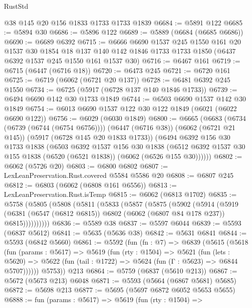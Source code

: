\begin{lexlean}{RustStd}
\begin{coremodule}
    @38
    @145
    @20
    @156
    @1833
    @1733
    @1733
    @1839
@6684 := @5891 @122
@6685 := @5894 @30
@6686 := @5896 @122
@6689 := @5889 (@6684 (@6685 @6686))
@6690 := @6689 @6392
@6715 := @6666
    @6690
    @1537
    @245
    @1550
    @161
    @20
    @1537
    @30
    @1854
    @18
    @137
    @140
    @142
    @1846
    @1733
    @1733
    @1850
    (@6437 @6392 @1537 @245 @1550 @161 @1537 @30)
@6716 := @6467 @161
@6719 := @6715 (@6447 (@6716 @18))
@6720 := @6473 @245
@6721 := @6720 @161
@6725 := @6719 (@6062 (@6721 @20 @137))
@6728 := @6481 @6392 @245 @1550
@6734 := @6725 (@5917 (@6728 @137 @140 @1846 @1733))
@6739 := @6494 @6690 @142 @30 @1733 @1849
@6744 := @6503 @6690 @1537 @142 @30 @1849
@6754 := @6013 @6690 @1537 @122 @30 @122 @1849 (@6021 (@6022 @6690 @122))
@6756 := @6029 (@6030 @1849)
@6800 := @6665
    (@6683
      (@6734 (@6739 (@6744 (@6754 @6756))))
      (@6447 (@6716 @38))
      (@6062 (@6721 @21 @145))
      (@5917 (@6728 @145 @20 @1833 @1733))
      (@6494
        @6392
        @156
        @30
        @1733
        @1838
        (@6503
          @6392
          @1537
          @156
          @30
          @1838
          (@6512 @6392 @1537 @30 @155 @1838 (@6520 (@6521 @1838)) (@6062 (@6526 @155 @30))))))
@6802 := @6062 (@5726 @20)
@6803 := @6800 @6802
@6807 := LexLeanPreservation.Rust.covered @5584 @5586 @20
@6808 := @6807 @245
@6812 := @6803 (@6062 (@6808 @161 @6556))
@6813 := LexLeanPreservation.Rust.isTemp
@6815 := @6062 (@6813 @1702)
@6835 := @5758
    (@5805
      (@5808
        (@5811
          (@5833
            (@5857
              (@5875
                (@5902
                  (@5914
                    (@5919
                      (@6381
                        (@6547 (@6812 @6815))
                        @6802
                        (@6062 (@6807 @84 @178 @237))
                        @6815))))))))))
@6836 := @5589 @38
@6837 := @5597 @6044
@6839 := @5593 (@6837 @5612)
@6841 := @5635 (@5636 @38)
@6842 := @5631 @6841
@6844 := @5593 (@6842 @5660)
@6861 := @5592
    (fun (fn : @7) =>
    @6839
      (@5615
        (@5618
          (fun (params : @5617) =>
          @5619
            (fun (rty : @1504) =>
            @5621
              (fun (lets : @5620) =>
              @5622 (fun (tail : @1722) => @5624 (fun (Γ : @5623) => @6844 @5707))))))
        @5753))
    @213
@6864 := @5759 (@6837 (@5610 @213))
@6867 := @5672 (@5673 @213) @6048
@6871 := @5593 (@5664 (@6867 @5681) @5685)
@6872 := @5698 @213
@6877 := @5695 (@5697 @6872 @6052 @5653 @5655)
@6888 := fun (params : @5617) =>
  @5619
    (fun (rty : @1504) =>

\end{coremodule}
\end{lexlean}
